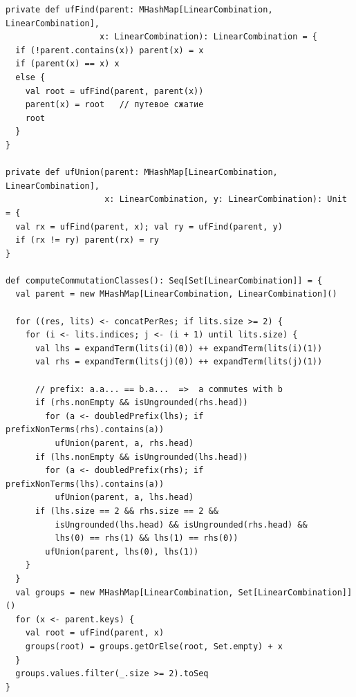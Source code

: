 \documentclass[14pt, russian]{scrartcl}
\begin{document}
\newpage
\begin{listing}[H]
\caption{Union-Find и метод \texttt{computeCommutationClasses}}
\label{lst:uf}
\begin{verbatim}
private def ufFind(parent: MHashMap[LinearCombination, LinearCombination],
                   x: LinearCombination): LinearCombination = {
  if (!parent.contains(x)) parent(x) = x
  if (parent(x) == x) x
  else {
    val root = ufFind(parent, parent(x))
    parent(x) = root   // путевое сжатие
    root
  }
}

private def ufUnion(parent: MHashMap[LinearCombination, LinearCombination],
                    x: LinearCombination, y: LinearCombination): Unit = {
  val rx = ufFind(parent, x); val ry = ufFind(parent, y)
  if (rx != ry) parent(rx) = ry
}

def computeCommutationClasses(): Seq[Set[LinearCombination]] = {
  val parent = new MHashMap[LinearCombination, LinearCombination]()

  for ((res, lits) <- concatPerRes; if lits.size >= 2) {
    for (i <- lits.indices; j <- (i + 1) until lits.size) {
      val lhs = expandTerm(lits(i)(0)) ++ expandTerm(lits(i)(1))
      val rhs = expandTerm(lits(j)(0)) ++ expandTerm(lits(j)(1))

      // prefix: a.a... == b.a...  =>  a commutes with b
      if (rhs.nonEmpty && isUngrounded(rhs.head))
        for (a <- doubledPrefix(lhs); if prefixNonTerms(rhs).contains(a))
          ufUnion(parent, a, rhs.head)
      if (lhs.nonEmpty && isUngrounded(lhs.head))
        for (a <- doubledPrefix(rhs); if prefixNonTerms(lhs).contains(a))
          ufUnion(parent, a, lhs.head)
      if (lhs.size == 2 && rhs.size == 2 &&
          isUngrounded(lhs.head) && isUngrounded(rhs.head) &&
          lhs(0) == rhs(1) && lhs(1) == rhs(0))
        ufUnion(parent, lhs(0), lhs(1))
    }
  }
  val groups = new MHashMap[LinearCombination, Set[LinearCombination]]()
  for (x <- parent.keys) {
    val root = ufFind(parent, x)
    groups(root) = groups.getOrElse(root, Set.empty) + x
  }
  groups.values.filter(_.size >= 2).toSeq
}
\end{verbatim}
\end{listing}
\end{document}
